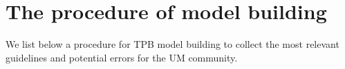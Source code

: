 \documentclass{llncs}
\begin{document}


\section{The procedure of model building}\label{Sec_AzenProc}

We list below a procedure for TPB model building to collect the most relevant guidelines and potential errors for the UM community. 
\end{document}
